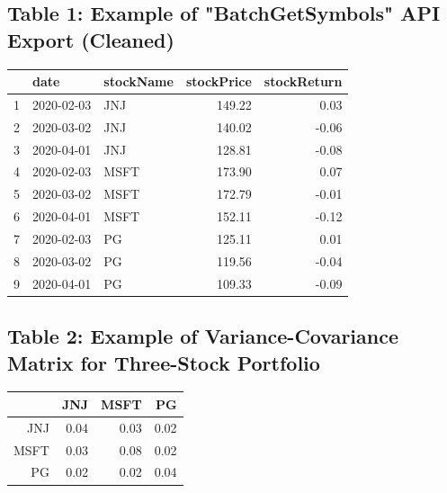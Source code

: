\documentclass[12pt,english]{article}
\begin{document}
        \subsection{Table 1: Example of "BatchGetSymbols" API Export (Cleaned)}        
            \begin{center}
                \begin{table}[ht]
                \centering
                \begin{tabular}{rllrr}
                  \hline
                 & date & stockName & stockPrice & stockReturn \\ 
                  \hline
                1 & 2020-02-03 & JNJ & 149.22 & 0.03 \\ 
                  2 & 2020-03-02 & JNJ & 140.02 & -0.06 \\ 
                  3 & 2020-04-01 & JNJ & 128.81 & -0.08 \\ 
                  4 & 2020-02-03 & MSFT & 173.90 & 0.07 \\ 
                  5 & 2020-03-02 & MSFT & 172.79 & -0.01 \\ 
                  6 & 2020-04-01 & MSFT & 152.11 & -0.12 \\ 
                  7 & 2020-02-03 & PG & 125.11 & 0.01 \\ 
                  8 & 2020-03-02 & PG & 119.56 & -0.04 \\ 
                  9 & 2020-04-01 & PG & 109.33 & -0.09 \\ 
                   \hline
                \end{tabular}
                \end{table}
            \end{center}
        
        \subsection{Table 2: Example of Variance-Covariance Matrix for Three-Stock Portfolio} 
                \begin{table}[ht]
                \centering
                \begin{tabular}{rrrr}
                \hline
                 & JNJ & MSFT & PG \\ 
                \hline
                JNJ & 0.04 & 0.03 & 0.02 \\ 
                  MSFT & 0.03 & 0.08 & 0.02 \\ 
                  PG & 0.02 & 0.02 & 0.04 \\ 
                \hline
                \end{tabular}
                \end{table}
        
\end{document}
